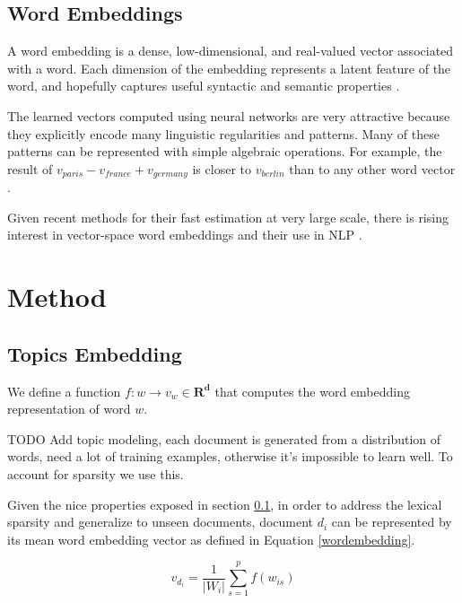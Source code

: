 \documentclass{article}
\begin{document}
\subsection{Word Embeddings}
\label{emb}

A word embedding is a dense, low-dimensional, and real-valued vector associated with a word. Each dimension of the embedding represents a latent feature of the word, and hopefully captures useful syntactic and semantic properties \cite{Turian10wordrepresentations}.

The learned vectors computed using neural networks are very attractive because they explicitly encode many linguistic regularities and patterns. Many of these patterns can be represented with simple algebraic operations. For example, the result of $v_{paris} - v_{france} + v_{germany}$ is closer to $v_{berlin}$ than to any other word vector \cite{mikolovChen,mikolovYih}.

Given recent methods for their fast estimation at very large scale, there is rising interest in vector-space word embeddings and their use in NLP \cite{Arvind14}.

\section{Method}
\label{approach}

\subsection{Topics Embedding}
\label{docwordemb}

We define a function $f : w \rightarrow v_w \in \mathbf{R^d}$ that computes the word embedding representation of word $w$.

TODO Add topic modeling, each document is generated from a distribution of words, need a lot of training examples, otherwise it's impossible to learn well. To account for sparsity we use this.

Given the nice properties exposed in section \ref{emb}, in order to address the lexical sparsity and generalize to unseen documents, document $d_{i}$ can be represented by its mean word embedding vector as defined in Equation \ref{wordembedding}.

\begin{equation}
\label{wordembedding}
v_{d_{i}} = \frac{1}{|W_i|} \sum_{s=1}^{p}{f(w_{is})}
\end{equation}

\end{document}
